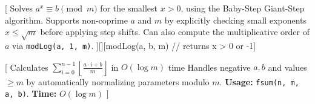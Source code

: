 [%
  Solves $a^x \equiv b \pmod m$ for the smallest $x > 0$, using the Baby-Step Giant-Step algorithm.
  Supports non-coprime $a$ and $m$ by explicitly checking small exponents $x \le \sqrt{m}$ before applying step shifts.
  Can also compute the multiplicative order of $a$ via \texttt{modLog(a, 1, m)}.
][][modLog(a, b, m) // returns x > 0 or -1]

[
  Calculates $\sum_{i=0}^{n-1} \left\lfloor \frac{a \cdot i + b}{m} \right\rfloor$ in $O(\log m)$ time
  Handles negative $a, b$ and values $\ge m$ by automatically normalizing parameters modulo $m$.
  \textbf{Usage:} \texttt{fsum(n, m, a, b)}.
  \textbf{Time:} $O(\log m)$
]

